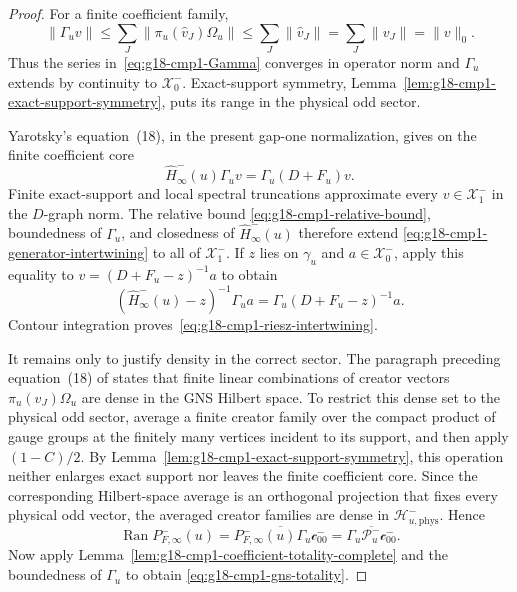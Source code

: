 \begin{proof}
For a finite coefficient family,
\[
 \|\Gamma_uv\|
 \le\sum_J\|\pi_u(\widehat v_J)\Omega_u\|
 \le\sum_J\|\widehat v_J\|
 =\sum_J\|v_J\|=\|v\|_0.
\]
Thus the series in~\eqref{eq:g18-cmp1-Gamma} converges in operator norm and
$\Gamma_u$ extends by continuity to $\mathcal X_0^-$.  Exact-support
symmetry, Lemma~\ref{lem:g18-cmp1-exact-support-symmetry}, puts its range in
the physical odd sector.

 Yarotsky's equation~(18), in the present gap-one normalization, gives on the
 finite coefficient core
 \begin{equation}
  \widehat H_\infty^-(u)\Gamma_uv=\Gamma_u(D+F_u)v.
 \label{eq:g18-cmp1-generator-intertwining}
\end{equation}
Finite exact-support and local spectral truncations approximate every
$v\in\mathcal X_1^-$ in the $D$-graph norm.  The relative bound
\eqref{eq:g18-cmp1-relative-bound}, boundedness of $\Gamma_u$, and closedness
 of $\widehat H_\infty^-(u)$ therefore extend
\eqref{eq:g18-cmp1-generator-intertwining} to all of
 $\mathcal X_1^-$.  If $z$ lies on $\gamma_u$ and $a\in\mathcal X_0^-$,
apply this equality to
$v=(D+F_u-z)^{-1}a$ to obtain
\begin{equation}
  (\widehat H_\infty^-(u)-z)^{-1}\Gamma_ua
 =\Gamma_u(D+F_u-z)^{-1}a.
 \label{eq:g18-cmp1-resolvent-intertwining}
\end{equation}
Contour integration proves~\eqref{eq:g18-cmp1-riesz-intertwining}.

 It remains only to justify density in the correct sector.  The paragraph
 preceding equation~(18) of \cite{Yarotsky2004QP} states that finite linear
 combinations of creator vectors $\pi_u(\widehat v_J)\Omega_u$ are dense in
 the GNS Hilbert space.  To restrict this dense set to the physical odd
 sector, average a finite creator family over
the compact product of gauge groups at the finitely many vertices incident
to its support, and then apply $(1-C)/2$.  By
Lemma~\ref{lem:g18-cmp1-exact-support-symmetry}, this operation neither
enlarges exact support nor leaves the finite coefficient core.  Since the
corresponding Hilbert-space average is an orthogonal projection that fixes
every physical odd vector, the averaged creator families are dense in
$\mathcal H_{u,\mathrm{phys}}^-$.  Hence
\[
 \operatorname{Ran}P_{F,\infty}^-(u)
 =\overline{P_{F,\infty}^-(u)\Gamma_u\mathcal c_{00}^-}
 =\overline{\Gamma_u\mathcal P_u^-\mathcal c_{00}^-}.
\]
Now apply Lemma~\ref{lem:g18-cmp1-coefficient-totality-complete} and the
boundedness of $\Gamma_u$ to obtain
\eqref{eq:g18-cmp1-gns-totality}.
\end{proof}


